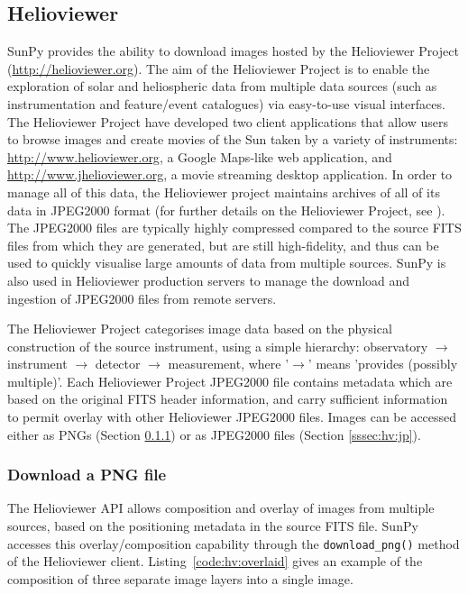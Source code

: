 \subsection{Helioviewer}\label{ssec:hv}

SunPy provides the ability to download images hosted by the
Helioviewer Project (\url{http://helioviewer.org}).  
The aim of the Helioviewer Project is to enable
the exploration of solar and heliospheric data from multiple data
sources (such as instrumentation and feature/event catalogues) via
easy-to-use visual interfaces. The Helioviewer Project have developed two client 
applications that allow users to browse images and create movies of the Sun taken 
by a variety of instruments: \url{http://www.helioviewer.org}, a 
Google Maps-like web application, and \url{http://www.jhelioviewer.org}, 
a movie streaming desktop application. In order to manage all of this data, the Helioviewer
project maintains archives of all of its data in JPEG2000 format (for further
details on the Helioviewer Project, see \citealt{muller2009}). The
JPEG2000 files are typically highly compressed compared to the source
FITS files from which they are generated, but are still high-fidelity, and thus can be used to quickly
visualise large amounts of data from multiple sources.  SunPy is
also used in Helioviewer production servers to manage the download and
ingestion of JPEG2000 files from remote servers.

The Helioviewer Project categorises image data based on the physical
construction of the source instrument, using a simple hierarchy:
observatory $\rightarrow$ instrument $\rightarrow$ detector
$\rightarrow$ measurement, where '$\rightarrow$' means 'provides
(possibly multiple)'.  
Each Helioviewer Project JPEG2000 file contains
metadata which are based on the original FITS header
information, and carry sufficient information to permit overlay with
other Helioviewer JPEG2000 files. Images can be accessed either as
PNGs (Section \ref{sssec:hv:png}) or as JPEG2000 files (Section
\ref{sssec:hv:jp}).

\subsubsection{Download a PNG file}\label{sssec:hv:png}

The Helioviewer API allows composition and overlay of images from
multiple sources, based on the positioning metadata in the source FITS
file.  SunPy accesses this overlay/composition capability through the
\texttt{download\_png()} method of the Helioviewer client.  Listing~\ref{code:hv:overlaid}
gives an example of the composition of three
separate image layers into a single image.

